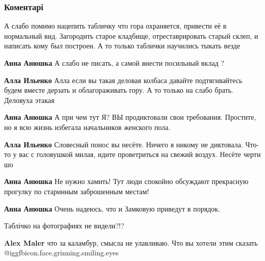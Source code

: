  
 
 
 
 
\subsubsection{Коментарі}
\label{sec:21_08_2021.fb.fb_group.story_kiev_ua.1.zamkovaja_gora.cmt}

\begin{itemize} %

А слабо помимо нацепить табличку что гора охраняется, привести её в нормальный
вид. Загородить старое кладбище, отреставрировать старый склеп, и написать кому
был построен. А то только таблички научились тыкать везде

\begin{itemize} %
\textbf{Анна Анюшка} А слабо не писать, а самой внести посильный вклад ?

\begin{itemize} %
\textbf{Алла Ильенко} Алла если вы такая деловая колбаса давайте подтягивайтесь будем вместе дерзать и облагораживать гору. А то только на слабо брать. Деловуха этакая

\textbf{Анна Анюшка} А при чем тут Я? ВЫ продиктовали свои требования. Простите, но я всю жизнь избегала начальников женского пола.

\textbf{Алла Ильенко} Словесный понос вы несёте. Ничего я никому не диктовала. Что-то у вас с головушкой милая, идите проветриться на свежий воздух. Несёте черти шо

\textbf{Анна Анюшка} Не нужно хамить! Тут люди спокойно обсуждают прекрасную прогулку по старинным заброшенным местам!
\end{itemize} %

\textbf{Анна Анюшка} Очень надеюсь, что и Замковую приведут в порядок.

Таблічко на фотографиях не видели?!?

\begin{itemize} %
\textbf{Alex Maler} что за каламбур, смысла не улавливаю. Что вы хотели этим сказать @igg{fbicon.face.grinning.smiling.eyes} 


\end{itemize}
\end{itemize}
\end{itemize}
